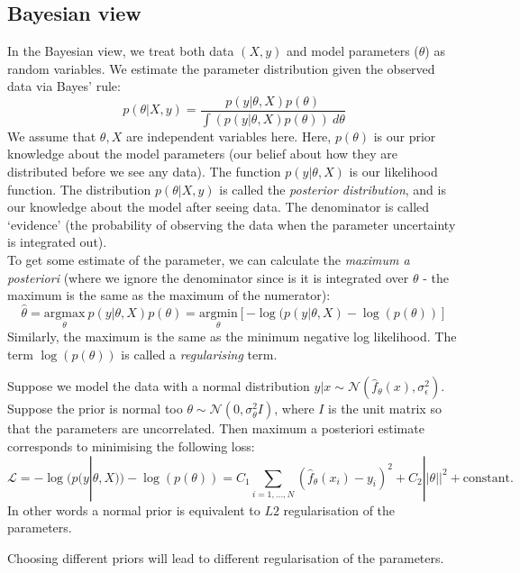 \newpage

\subsection{Bayesian view}
In the Bayesian view, we treat both data $(X,y)$ and model parameters ($\theta$) as random variables. We estimate the parameter distribution given the observed data via Bayes' rule:
\begin{equation*}
p(\theta | X,y) = \frac{p(y | \theta,X) p(\theta)}{\displaystyle \int \left( p(y | \theta,X) p(\theta) \right) \ d\theta}
\end{equation*}
We assume that $\theta, X$ are independent variables here. Here, $p(\theta)$ is our prior knowledge about the model parameters (our belief about how they are distributed before we see any data). The function $p(y | \theta, X)$ is our likelihood function. The distribution $p(\theta | X,y)$ is called the \textit{posterior distribution}, and is our knowledge about the model after seeing data. The denominator is called `evidence' (the probability of observing the data when the parameter uncertainty is integrated out). \\

To get some estimate of the parameter, we can calculate the \textit{maximum a posteriori} (where we ignore the denominator since is it is integrated over $\theta$ - the maximum is the same as the maximum of the numerator):
\begin{equation*}
\hat{\theta} = \underset{\theta}{\textrm{argmax}}\ p(y | \theta, X) p(\theta) = \underset{\theta}{\textrm{argmin}}\left[ - \log(p(y | \theta, X) - \log(p(\theta)) \right]
\end{equation*}
Similarly, the maximum is the same as the minimum negative log likelihood. The term $\log(p(\theta))$ is called a \textit{regularising} term.

\begin{frameex}
Suppose we model the data with a normal distribution $y|x \sim \mathcal{N}(\hat{f}_{\theta}(x), \sigma_{\epsilon}^2)$. Suppose the prior is normal too $\theta \sim \mathcal{N}(0, \sigma_{\theta}^2 I)$, where $I$ is the unit matrix so that the parameters are uncorrelated. Then maximum a posteriori estimate corresponds to minimising the following loss:
\begin{equation*}
\mathcal{L} = -\log(p(y|\theta,X)) - \log(p(\theta)) = C_1 \sum_{i=1,...,N} (\hat{f}_{\theta}(x_i) - y_i)^2 + C_2 || \theta||^2 + \text{constant}.
\end{equation*}
In other words a normal prior is equivalent to $L2$ regularisation of the parameters.
\end{frameex} 

Choosing different priors will lead to different regularisation of the parameters.







